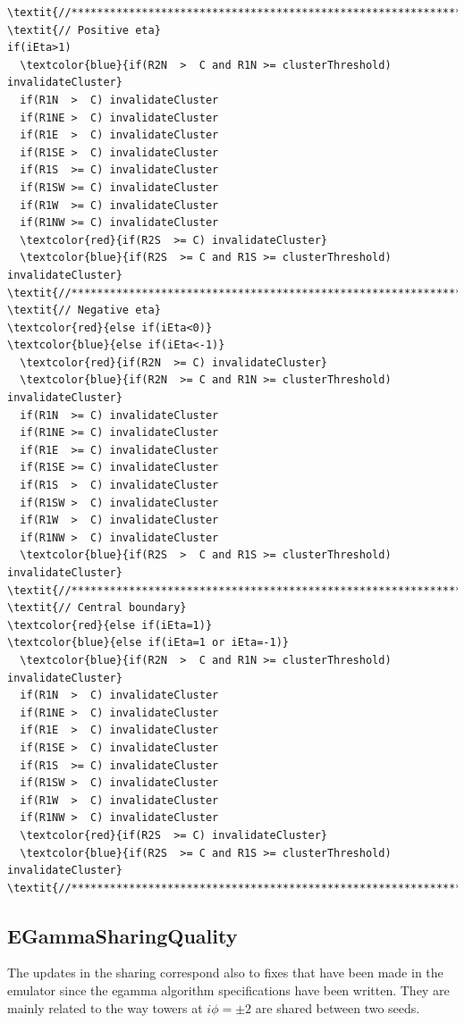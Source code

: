 \documentclass[a4paper, 12pt]{article}
\begin{document}
\begin{Verbatim}[label={Filtering updates}]
\textit{//******************************************************************//}
\textit{// Positive eta}
if(iEta>1) 
  \textcolor{blue}{if(R2N  >  C and R1N >= clusterThreshold) invalidateCluster}
  if(R1N  >  C) invalidateCluster
  if(R1NE >  C) invalidateCluster
  if(R1E  >  C) invalidateCluster
  if(R1SE >  C) invalidateCluster
  if(R1S  >= C) invalidateCluster
  if(R1SW >= C) invalidateCluster
  if(R1W  >= C) invalidateCluster
  if(R1NW >= C) invalidateCluster
  \textcolor{red}{if(R2S  >= C) invalidateCluster}
  \textcolor{blue}{if(R2S  >= C and R1S >= clusterThreshold) invalidateCluster}
\textit{//******************************************************************//}
\textit{// Negative eta}
\textcolor{red}{else if(iEta<0)}
\textcolor{blue}{else if(iEta<-1)}
  \textcolor{red}{if(R2N  >= C) invalidateCluster}
  \textcolor{blue}{if(R2N  >= C and R1N >= clusterThreshold) invalidateCluster}
  if(R1N  >= C) invalidateCluster
  if(R1NE >= C) invalidateCluster
  if(R1E  >= C) invalidateCluster
  if(R1SE >= C) invalidateCluster
  if(R1S  >  C) invalidateCluster
  if(R1SW >  C) invalidateCluster
  if(R1W  >  C) invalidateCluster
  if(R1NW >  C) invalidateCluster
  \textcolor{blue}{if(R2S  >  C and R1S >= clusterThreshold) invalidateCluster}
\textit{//******************************************************************//}
\textit{// Central boundary}
\textcolor{red}{else if(iEta=1)}
\textcolor{blue}{else if(iEta=1 or iEta=-1)}
  \textcolor{blue}{if(R2N  >  C and R1N >= clusterThreshold) invalidateCluster}
  if(R1N  >  C) invalidateCluster
  if(R1NE >  C) invalidateCluster
  if(R1E  >  C) invalidateCluster
  if(R1SE >  C) invalidateCluster
  if(R1S  >= C) invalidateCluster
  if(R1SW >  C) invalidateCluster
  if(R1W  >  C) invalidateCluster
  if(R1NW >  C) invalidateCluster
  \textcolor{red}{if(R2S  >= C) invalidateCluster}
  \textcolor{blue}{if(R2S  >= C and R1S >= clusterThreshold) invalidateCluster}
\textit{//******************************************************************//}
\end{Verbatim}


\subsection{EGammaSharingQuality}\label{sec:sharing1}
The updates in the sharing correspond also to fixes that have been made in the emulator since the egamma algorithm specifications have been written. They are mainly related to the way towers at $i\phi=\pm2$ are shared between two seeds.
\end{document}
